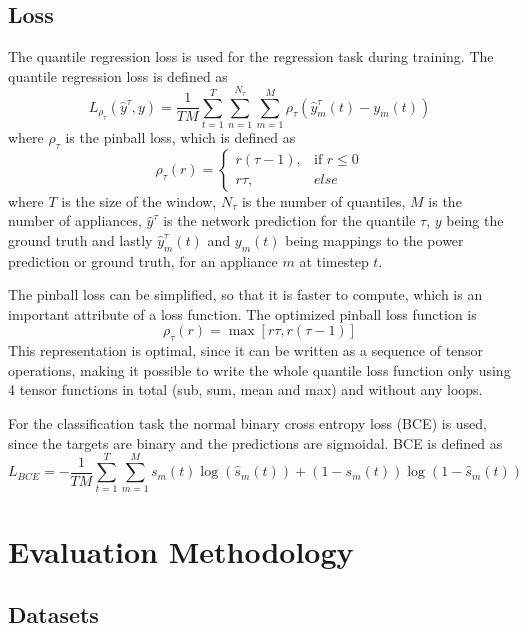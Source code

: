 \documentclass[sigconf]{acmart}
\begin{document}
\subsection{Loss}
The quantile regression loss is used for the regression task during training.
The quantile regression loss is defined as
\begin{equation}
  L_{\rho_{\tau}}(\hat{y}^{\tau}, y) = \frac{1}{TM}\sum_{t=1}^T\sum_{n=1}^{N_{\tau}}\sum_{m=1}^M \rho_{\tau}(\hat{y}_m^{\tau}(t) - y_m(t))
\end{equation}
where $\rho_{\tau}$ is the pinball loss, which is defined as
\begin{equation}
  \rho_{\tau}(r) = \begin{cases}
    r(\tau - 1), & \text{if $r \leq 0$} \\
    r\tau, & else
  \end{cases}
\end{equation}
where $T$ is the size of the window, $N_{\tau}$ is the number of quantiles, $M$ is the number of appliances, $\hat{y}^{\tau}$ is the network prediction
for the quantile $\tau$, $y$ being the ground truth and lastly $\hat{y}_m^{\tau}(t)$ and $y_m(t)$ being mappings to the power prediction or ground truth,
for an appliance $m$ at timestep $t$.

The pinball loss can be simplified, so that it is faster to compute, which is an important attribute of a loss function.
The optimized pinball loss function is 
\begin{equation}
  \rho_{\tau}(r) = \max [r\tau, r(\tau -1)]
\end{equation}
This representation is optimal, since it can be written as a sequence of tensor operations, making it possible to write the whole quantile loss function 
only using 4 tensor functions in total (sub, sum, mean and max) and without any loops.

For the classification task the normal binary cross entropy loss (BCE) is used, since the targets are binary and the predictions are sigmoidal.
BCE is defined as
\begin{equation}
  L_{BCE} = - \frac{1}{TM} \sum_{t=1}^T \sum_{m=1}^M s_m(t)\log(\hat{s}_m(t)) + (1 - s_m(t))\log(1 - \hat{s}_m(t))
\end{equation}

\section{Evaluation Methodology}\label{chapter:evaluation}
\subsection{Datasets}
\end{document}
